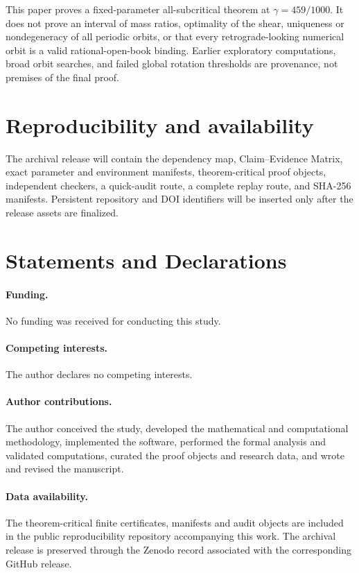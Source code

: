 \documentclass[11pt]{article}
\begin{document}
This paper proves a fixed-parameter all-subcritical theorem at $\gamma=459/1000$. It does not prove an interval of mass ratios, optimality of the shear, uniqueness or nondegeneracy of all periodic orbits, or that every retrograde-looking numerical orbit is a valid rational-open-book binding. Earlier exploratory computations, broad orbit searches, and failed global rotation thresholds are provenance, not premises of the final proof.

\section{Reproducibility and availability}
The archival release will contain the dependency map, Claim--Evidence Matrix, exact parameter and environment manifests, theorem-critical proof objects, independent checkers, a quick-audit route, a complete replay route, and SHA-256 manifests. Persistent repository and DOI identifiers will be inserted only after the release assets are finalized.

\section*{Statements and Declarations}
\paragraph{Funding.} No funding was received for conducting this study.
\paragraph{Competing interests.} The author declares no competing interests.
\paragraph{Author contributions.} The author conceived the study, developed the mathematical and computational methodology, implemented the software, performed the formal analysis and validated computations, curated the proof objects and research data, and wrote and revised the manuscript.
\paragraph{Data availability.} The theorem-critical finite certificates, manifests and audit objects are included in the public reproducibility repository accompanying this work. The archival release is preserved through the Zenodo record associated with the corresponding GitHub release.
\end{document}
